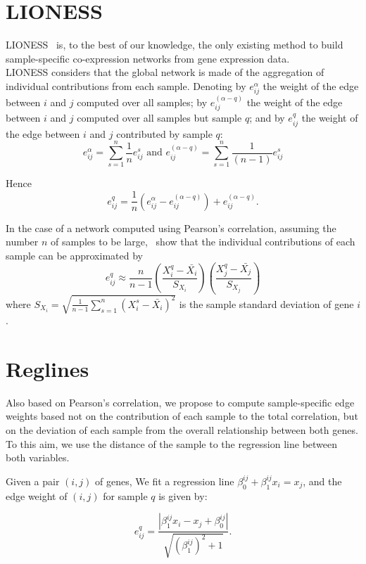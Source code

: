 \documentclass[12pt,a4paper]{article}
\begin{document}
\section{LIONESS}
LIONESS~\cite{kuijjer2015} is, to the best of our knowledge, the only existing method to build sample-specific co-expression networks from gene expression data.\\

LIONESS considers that the global network is made of the aggregation of individual contributions from each sample. 
Denoting by $e_{ij}^\alpha$ the weight of the edge between $i$ and $j$ computed over all samples;
by $e_{ij}^{(\alpha - q)}$ the weight of the edge between $i$ and $j$ computed over all samples but sample $q$;
and by $e_{ij}^q$ the weight of the edge between $i$ and $j$ contributed by sample $q$:
    \[
    e_{ij}^\alpha = \sum_{s=1}^n \frac{1}{n} e_{ij}^s 
    \mbox{ and }
    e_{ij}^{(\alpha - q)} = \sum_{s=1}^n \frac{1}{(n-1)} e_{ij}^s
    \]

Hence
    \[
    e_{ij}^q = \frac{1}{n} \left(  e_{ij}^{\alpha} - e_{ij}^{(\alpha - q)} \right) + e_{ij}^{(\alpha - q)}.
    \]

In the case of a network computed using Pearson's correlation, assuming the number $n$ of samples to be large,~\cite{kuijjer2015} show that the individual contributions of each sample can be approximated by
    \[
    e_{ij}^q \approx \frac{n}{n-1} \left( \frac{X_i^q - \bar {X_i}}{S_{X_i}} \right) 
    \left( \frac{X_j^q - \bar {X_j}}{S_{X_j}} \right)
    \]
    where $S_{X_i} = \sqrt{\frac{1}{n-1} \sum_{s=1}^n \left( X_i^s - \bar{X_i} \right)^2}$ is the sample standard deviation of gene $i$.


\section{Reglines}
Also based on Pearson's correlation, we propose to compute sample-specific edge weights based not on the contribution of each sample to the total correlation, but on the deviation of each sample from the overall relationship between both genes. To this aim, we use the distance of the sample to the regression line between both variables.

Given a pair $(i, j)$ of genes, We fit a regression line $\beta_0^{ij} + \beta_1^{ij} x_i = x_j$, and the edge weight of $(i, j)$ for sample $q$ is given by:

\[
e_{ij}^q = \frac{|\beta_1^{ij} x_i - x_j + \beta_0^{ij}|}{\sqrt{(\beta_1^{ij})^2+1}}.
\]




\end{document}
